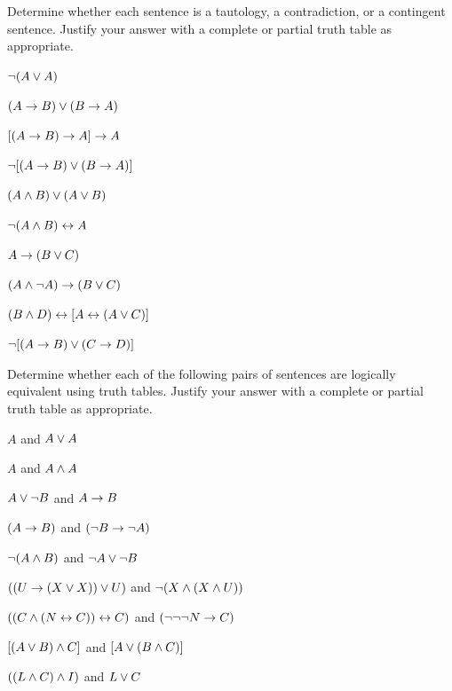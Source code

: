 \noindent\problempart
\label{pr.TT.TTorC4}
Determine whether each sentence is a tautology, a contradiction, or a contingent sentence. Justify your answer with a complete or partial truth table as appropriate.
\begin{compactlist}
\item  $\neg (A \vee A)$\vspace{.5ex}							%
\item $(A \rightarrow B) \vee (B \rightarrow A)$\vspace{.5ex}					%
\item $[(A \rightarrow B) \rightarrow A] \rightarrow A$\vspace{.5ex}					%
\item $\neg[( A \rightarrow B) \vee (B \rightarrow A)]$\vspace{.5ex}			%
\item $(A \wedge B) \vee (A \vee B)$\vspace{.5ex} 				%
\item $\neg(A\wedge B) \leftrightarrow A$\vspace{.5ex} 					%
\item $A\rightarrow(B\vee C)$\vspace{.5ex} 							%
\item $(A \wedge\neg A) \rightarrow (B \vee C)$\vspace{.5ex} 			%
\item $(B\wedge D) \leftrightarrow [A \leftrightarrow(A \vee C)]$\vspace{.5ex}			%
\item $\neg[(A \rightarrow B) \vee (C \rightarrow D)]$\vspace{.5ex} 			%
\end{compactlist}



\noindent\problempart
Determine whether each of the following pairs of sentences are logically equivalent using truth tables. Justify your answer with a complete or partial truth table as appropriate.
\begin{compactlist}
\item $A$ and $A \vee A$
\item $A$ and $A \wedge A$
\item $A \vee \neg B$ and $A\rightarrow B$
\item $(A \rightarrow B)$ and $(\neg B \rightarrow \neg A)$
\item $\neg(A \wedge B)$ and $\neg A \vee \neg B$
\item $ ((U \rightarrow (X \vee X)) \vee U)$ and $\neg (X \wedge (X \wedge U))$
\item $ ((C \wedge (N \leftrightarrow C)) \leftrightarrow C)$ and $(\neg \neg \neg N \rightarrow C)$
\item $[(A \vee B) \wedge C]$ and $[A \vee (B \wedge C)]$
\item $((L \wedge C) \wedge I)$ and $L \vee C$
\end{compactlist}


